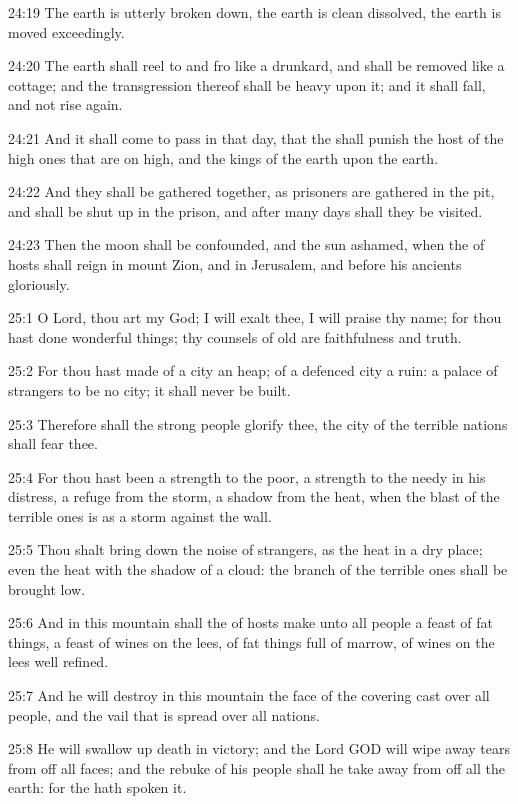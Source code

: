 24:19 The earth is utterly broken down, the earth is clean dissolved,
the earth is moved exceedingly.

24:20 The earth shall reel to and fro like a drunkard, and shall be
removed like a cottage; and the transgression thereof shall be heavy
upon it; and it shall fall, and not rise again.

24:21 And it shall come to pass in that day, that the \LORD shall
punish the host of the high ones that are on high, and the kings of
the earth upon the earth.

24:22 And they shall be gathered together, as prisoners are gathered
in the pit, and shall be shut up in the prison, and after many days
shall they be visited.

24:23 Then the moon shall be confounded, and the sun ashamed, when the
\LORD of hosts shall reign in mount Zion, and in Jerusalem, and before
his ancients gloriously.

25:1 O Lord, thou art my God; I will exalt thee, I will praise thy
name; for thou hast done wonderful things; thy counsels of old are
faithfulness and truth.

25:2 For thou hast made of a city an heap; of a defenced city a ruin:
a palace of strangers to be no city; it shall never be built.

25:3 Therefore shall the strong people glorify thee, the city of the
terrible nations shall fear thee.

25:4 For thou hast been a strength to the poor, a strength to the
needy in his distress, a refuge from the storm, a shadow from the
heat, when the blast of the terrible ones is as a storm against the
wall.

25:5 Thou shalt bring down the noise of strangers, as the heat in a
dry place; even the heat with the shadow of a cloud: the branch of the
terrible ones shall be brought low.

25:6 And in this mountain shall the \LORD of hosts make unto all people
a feast of fat things, a feast of wines on the lees, of fat things
full of marrow, of wines on the lees well refined.

25:7 And he will destroy in this mountain the face of the covering
cast over all people, and the vail that is spread over all nations.

25:8 He will swallow up death in victory; and the Lord GOD will wipe
away tears from off all faces; and the rebuke of his people shall he
take away from off all the earth: for the \LORD hath spoken it.

